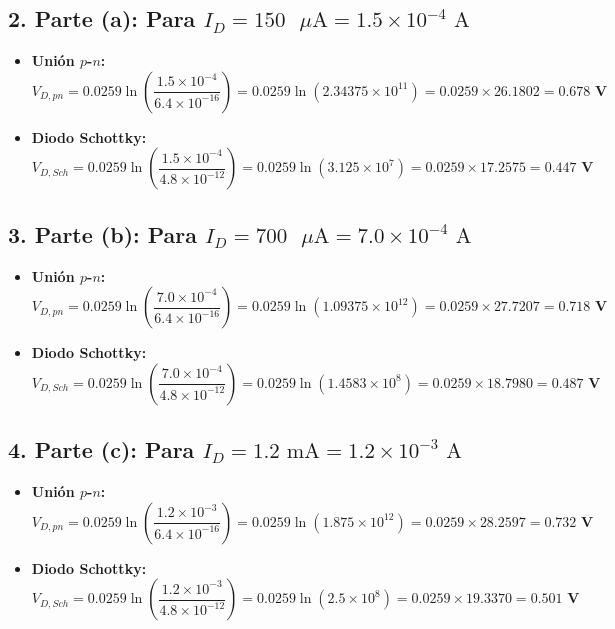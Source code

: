 \documentclass[11pt,a4paper]{article}
\begin{document}
\subsection*{2. Parte (a): Para $I_D = 150\text{ }\mu\text{A} = 1.5 \times 10^{-4}\text{ A}$}
\begin{itemize}
    \item \textbf{Unión $p$-$n$:}
    \[
    V_{D,pn} = 0.0259 \ln\left(\frac{1.5 \times 10^{-4}}{6.4 \times 10^{-16}}\right) = 0.0259 \ln(2.34375 \times 10^{11}) = 0.0259 \times 26.1802 = \mathbf{0.678\text{ V}}
    \]
    \item \textbf{Diodo Schottky:}
    \[
    V_{D,Sch} = 0.0259 \ln\left(\frac{1.5 \times 10^{-4}}{4.8 \times 10^{-12}}\right) = 0.0259 \ln(3.125 \times 10^7) = 0.0259 \times 17.2575 = \mathbf{0.447\text{ V}}
    \]
\end{itemize}

\subsection*{3. Parte (b): Para $I_D = 700\text{ }\mu\text{A} = 7.0 \times 10^{-4}\text{ A}$}
\begin{itemize}
    \item \textbf{Unión $p$-$n$:}
    \[
    V_{D,pn} = 0.0259 \ln\left(\frac{7.0 \times 10^{-4}}{6.4 \times 10^{-16}}\right) = 0.0259 \ln(1.09375 \times 10^{12}) = 0.0259 \times 27.7207 = \mathbf{0.718\text{ V}}
    \]
    \item \textbf{Diodo Schottky:}
    \[
    V_{D,Sch} = 0.0259 \ln\left(\frac{7.0 \times 10^{-4}}{4.8 \times 10^{-12}}\right) = 0.0259 \ln(1.4583 \times 10^8) = 0.0259 \times 18.7980 = \mathbf{0.487\text{ V}}
    \]
\end{itemize}

\subsection*{4. Parte (c): Para $I_D = 1.2\text{ mA} = 1.2 \times 10^{-3}\text{ A}$}
\begin{itemize}
    \item \textbf{Unión $p$-$n$:}
    \[
    V_{D,pn} = 0.0259 \ln\left(\frac{1.2 \times 10^{-3}}{6.4 \times 10^{-16}}\right) = 0.0259 \ln(1.875 \times 10^{12}) = 0.0259 \times 28.2597 = \mathbf{0.732\text{ V}}
    \]
    \item \textbf{Diodo Schottky:}
    \[
    V_{D,Sch} = 0.0259 \ln\left(\frac{1.2 \times 10^{-3}}{4.8 \times 10^{-12}}\right) = 0.0259 \ln(2.5 \times 10^8) = 0.0259 \times 19.3370 = \mathbf{0.501\text{ V}}
    \]
\end{itemize}
\end{document}
